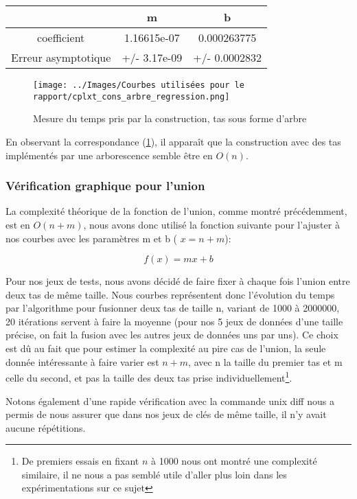 \documentclass[12pt,a4paper]{article}
\begin{document}
\begin{center}
\begin{tabular}{|c|c|c|}
\hline
 & m & b \\
\hline
coefficient & 1.16615e-07 & 0.000263775 \\
Erreur asymptotique & +/- 3.17e-09 & +/- 0.0002832  \\
\hline
\end{tabular}
\end{center}


\begin{figure}[hbtp]
\centering
\texttt{[image: ../Images/Courbes utilisées pour le rapport/cplxt\_cons\_arbre\_regression.png]}
\caption{Mesure du temps pris par la construction, tas sous forme d'arbre}
\label{fig4}
\end{figure}

En observant la correspondance (\ref{fig4}), il apparaît que la construction avec des tas implémentés par une arborescence semble être en $O(n)$.




\subsubsection{Vérification graphique pour l'union}

La complexité théorique de la fonction de l'union, comme montré précédemment, est en $O(n + m )$, nous avons donc utilisé la fonction suivante pour l'ajuster à nos courbes avec les paramètres m et b ( $x = n+m $): 

$$
f(x) = mx +b
$$

Pour nos jeux de tests, nous avons décidé de faire fixer à chaque fois l'union entre deux tas de même taille. Nous courbes représentent donc l'évolution du temps par l'algorithme pour fusionner deux tas de taille n, variant de 1000 à 2000000,  20 itérations servent à faire la moyenne (pour nos 5 jeux de données d'une taille précise, on fait la fusion avec les autres jeux de données uns par uns). Ce choix est dû au fait que pour estimer la complexité au pire cas de l'union, la seule donnée intéressante à faire varier est $n+m$, avec n la taille du premier tas et m celle du second, et pas la taille des deux tas prise individuellement\footnote{De premiers essais en fixant $n$ à 1000 nous ont montré une complexité similaire, il ne nous a pas semblé utile d'aller plus loin dans les expérimentations sur ce sujet}.

Notons également d'une rapide vérification avec la commande unix diff nous a permis de nous assurer que dans nos jeux de clés de même taille, il n'y avait aucune répétitions.
\end{document}
